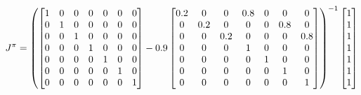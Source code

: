 \documentclass{article}
\begin{document}
\begin{equation}
    \notag
    J^\pi = \left(
    \begin{bmatrix}
        1 & 0 & 0 & 0 & 0 & 0 & 0 \\
        0 & 1 & 0 & 0 & 0 & 0 & 0 \\
        0 & 0 & 1 & 0 & 0 & 0 & 0 \\
        0 & 0 & 0 & 1 & 0 & 0 & 0 \\
        0 & 0 & 0 & 0 & 1 & 0 & 0 \\
        0 & 0 & 0 & 0 & 0 & 1 & 0 \\
        0 & 0 & 0 & 0 & 0 & 0 & 1 \\
    \end{bmatrix} - 0.9
    \begin{bmatrix}
        0.2 & 0 & 0 & 0.8 & 0 & 0 & 0 \\
        0 & 0.2 & 0 & 0 & 0 & 0.8 & 0 \\
        0 & 0 & 0.2 & 0 & 0 & 0 & 0.8 \\
        0 & 0 & 0 & 1 & 0 & 0 & 0 \\
        0 & 0 & 0 & 0 & 1 & 0 & 0 \\
        0 & 0 & 0 & 0 & 0 & 1 & 0 \\
        0 & 0 & 0 & 0 & 0 & 0 & 1 \\
    \end{bmatrix}\right)^{-1}
    \begin{bmatrix}
        1 \\
        1 \\
        1 \\
        1 \\
        1 \\
        1 \\
        1 \\
    \end{bmatrix}
\end{equation}
\end{document}
